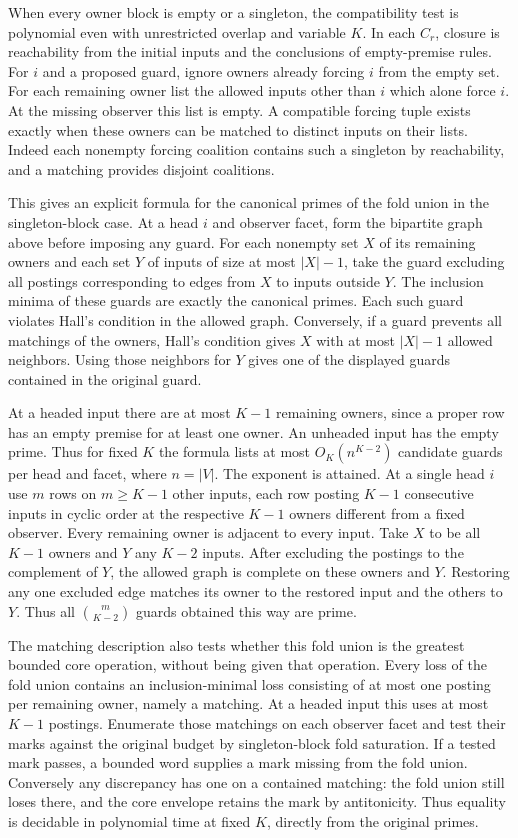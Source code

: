 When every owner block is empty or a singleton, the
compatibility test is polynomial even with unrestricted
overlap and variable $K$. In each $C_r$, closure is
reachability from the initial inputs and the conclusions
of empty-premise rules. For $i$ and a proposed guard,
ignore owners already forcing $i$ from the empty set.
For each remaining owner list the allowed inputs other
than $i$ which alone force $i$. At the missing observer
this list is empty. A compatible forcing tuple exists
exactly when these owners can be matched to distinct
inputs on their lists. Indeed each nonempty forcing
coalition contains such a singleton by reachability,
and a matching provides disjoint coalitions.

This gives an explicit formula for the canonical primes
of the fold union in the singleton-block case. At a head
$i$ and observer facet, form the bipartite graph above
before imposing any guard. For each nonempty set $X$ of
its remaining owners and each set $Y$ of inputs of size
at most $|X|-1$, take the guard excluding all postings
corresponding to edges from $X$ to inputs outside $Y$.
The inclusion minima of these guards are exactly the
canonical primes. Each such guard violates Hall's
condition in the allowed graph. Conversely, if a guard
prevents all matchings of the owners, Hall's condition
gives $X$ with at most $|X|-1$ allowed neighbors. Using
those neighbors for $Y$ gives one of the displayed guards
contained in the original guard.

At a headed input there are at most $K-1$ remaining owners,
since a proper row has an empty premise for at least one
owner. An unheaded input has the empty prime. Thus for
fixed $K$ the formula lists at most $O_K(n^{K-2})$
candidate guards per head and facet, where $n=|V|$.
The exponent is attained. At a single head $i$ use $m$
rows on $m\ge K-1$ other inputs, each row posting
$K-1$ consecutive inputs in cyclic order at the respective
$K-1$ owners different from a fixed observer. Every
remaining owner is adjacent to every input. Take $X$
to be all $K-1$ owners and $Y$ any $K-2$ inputs. After
excluding the postings to the complement of $Y$, the
allowed graph is complete on these owners and $Y$.
Restoring any one excluded edge matches its owner to
the restored input and the others to $Y$. Thus all
$\binom{m}{K-2}$ guards obtained this way are prime.

The matching description also tests whether this fold union
is the greatest bounded core operation, without being given
that operation. Every loss of the fold union contains an
inclusion-minimal loss consisting of at most one posting
per remaining owner, namely a matching. At a headed input
this uses at most $K-1$ postings. Enumerate those matchings
on each observer facet and test their marks against the
original budget by singleton-block fold saturation.
If a tested mark passes, a bounded word supplies a mark
missing from the fold union. Conversely any discrepancy
has one on a contained matching: the fold union still
loses there, and the core envelope retains the mark by
antitonicity. Thus equality is decidable in polynomial time
at fixed $K$, directly from the original primes.

